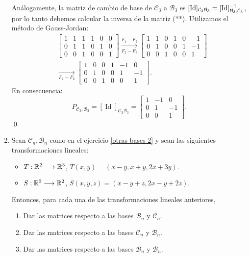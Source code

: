 \begin{enumerate}[topsep=6pt, itemsep=.4cm]
    Análogamente, la matriz de cambio de base  de  $\mathcal C_3$ a $\mathcal B_3$ es $[\operatorname{Id}]_{\mathcal C_3\mathcal B_3} = [\operatorname{Id}]_{{\mathcal{B}_3},{\mathcal{C}_3}}^{-1}$, por lo tanto debemos calcular la inversa de la matriz (**). Utilizamos el método de Gauss-Jordan:
\begin{align*}
    &\left[\begin{array}{ccc|ccc}
    1&1&1&1&0&0\\0&1&1&0&1&0\\0&0&1&0&0&1
    \end{array}\right] \underset{F_2-F_3}{\stackrel{F_1-F_3}{\longrightarrow}} \left[\begin{array}{ccc|ccc}
    1&1&0&1&0&-1\\0&1&0&0&1&-1\\0&0&1&0&0&1
    \end{array}\right] \\
    &\underset{F_1-F_2}{\longrightarrow} \left[\begin{array}{ccc|ccc}
    1&0&0&1&-1&0\\0&1&0&0&1&-1\\0&0&1&0&0&1
    \end{array}\right].
\end{align*}
En  consecuencia:
    \begin{equation*}
        P_{{\mathcal{C}_3},{\mathcal{B}_3}}=  [\operatorname{Id}]_{\mathcal C_3\mathcal B_3} =
        \begin{bmatrix}
        1&-1&0 \\
        0&1&-1\\
        0&0&1\end{bmatrix}. 
    \end{equation*}
\qed
    
\item \label{basesRn} Sean $\mathcal{C}_n, \mathcal{B}_n$ como en el ejercicio \ref{otras bases 2} y sean las siguientes transformaciones lineales:
\begin{itemize}
    \item\label{lineales1-a-2} $T:\mathbb R^2 \longrightarrow \mathbb R^3$, $T(x,y)=(x-y,x+y,2x+3y)$.
    \item\label{lineales1-b-2} $S:\mathbb R^3 \longrightarrow \mathbb R^2$, $S(x,y,z)=(x-y+z,2x-y+2z)$.
\end{itemize}

Entonces, para cada una de las transformaciones lineales anteriores,
\begin{enumerate}
    \item \label{basesRn-a} Dar las matrices respecto a las bases $\mathcal{B}_n$ y $\mathcal{C}_n$.
    \item \label{basesRn-b} Dar las matrices respecto a las bases $\mathcal{C}_n$ y $\mathcal{B}_n$.
    \item \label{basesRn-c} Dar las matrices respecto a las bases $\mathcal{B}_n$ y $\mathcal{B}_n$.
\end{enumerate}



\end{enumerate}
